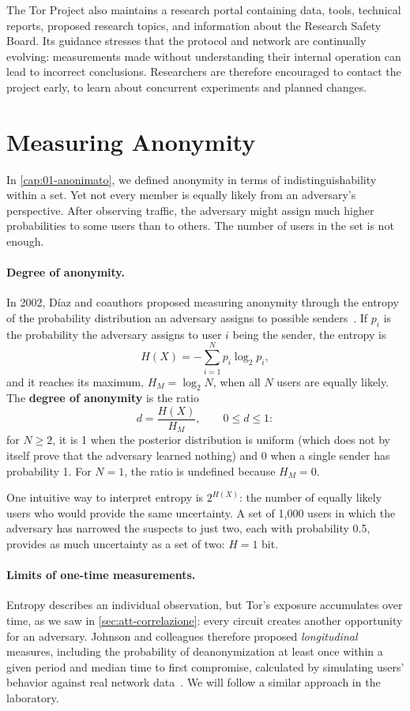 The Tor Project also maintains a research portal containing data, tools, technical reports, proposed research topics, and information about the Research Safety Board. Its guidance stresses that the protocol and network are continually evolving: measurements made without understanding their internal operation can lead to incorrect conclusions. Researchers are therefore encouraged to contact the project early, to learn about concurrent experiments and planned changes.

\section{Measuring Anonymity}\label{sec:ric-metriche}

In \cref{cap:01-anonimato}, we defined anonymity in terms of indistinguishability within a set. Yet not every member is equally likely from an adversary's perspective. After observing traffic, the adversary might assign much higher probabilities to some users than to others. The number of users in the set is not enough.

\paragraph{Degree of anonymity.} In 2002, Díaz and coauthors proposed measuring anonymity through the entropy of the probability distribution an adversary assigns to possible senders~\cite{diaz2002measuring}. If $p_i$ is the probability the adversary assigns to user $i$ being the sender, the entropy is
\[ H(X) = -\sum_{i=1}^{N} p_i \log_2 p_i, \]
and it reaches its maximum, $H_M = \log_2 N$, when all $N$ users are equally likely. The \textbf{degree of anonymity} is the ratio
\[ d = \frac{H(X)}{H_M}, \qquad 0 \le d \le 1: \]
for $N\ge 2$, it is 1 when the posterior distribution is uniform (which does not by itself prove that the adversary learned nothing) and 0 when a single sender has probability 1. For $N=1$, the ratio is undefined because $H_M=0$.

One intuitive way to interpret entropy is $2^{H(X)}$: the number of equally likely users who would provide the same uncertainty. A set of 1,000 users in which the adversary has narrowed the suspects to just two, each with probability 0.5, provides as much uncertainty as a set of two: $H = 1$ bit.

\paragraph{Limits of one-time measurements.} Entropy describes an individual observation, but Tor's exposure accumulates over time, as we saw in \cref{sec:att-correlazione}: every circuit creates another opportunity for an adversary. Johnson and colleagues therefore proposed \emph{longitudinal} measures, including the probability of deanonymization at least once within a given period and median time to first compromise, calculated by simulating users' behavior against real network data~\cite{johnson2013users}. We will follow a similar approach in the laboratory.

